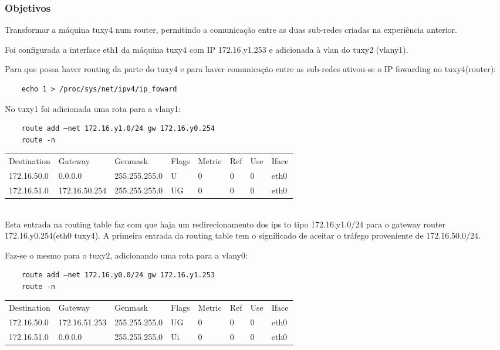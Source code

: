 \documentclass[a4paper]{article}
\begin{document}
\subsubsection{Objetivos}
Transformar a máquina tuxy4 num router, permitindo a comunicação entre as duas sub-redes criadas na experiência anterior.

Foi configurada a interface eth1 da máquina tuxy4 com IP 172.16.y1.253 e adicionada à vlan do tuxy2 (vlany1).

Para que possa haver routing da parte do tuxy4 e para haver comunicação entre as sub-redes ativou-se o IP fowarding no tuxy4(router):
\begin{verbatim}
	echo 1 > /proc/sys/net/ipv4/ip_foward
\end{verbatim}

No tuxy1 foi adicionada uma rota para a vlany1:
\begin{verbatim}
	route add –net 172.16.y1.0/24 gw 172.16.y0.254
	route -n
\end{verbatim}

\begin{tabular}{l l l l l l l l}
Destination & Gateway & Genmask & Flags & Metric & Ref & Use & Iface \\
172.16.50.0 & 0.0.0.0 & 255.255.255.0 & U & 0 & 0 & 0 & eth0 \\
172.16.51.0 & 172.16.50.254 & 255.255.255.0 & UG & 0 & 0 & 0 & eth0
\end{tabular} \\

Esta entrada na routing table faz com que haja um redirecionamento dos ips to tipo 172.16.y1.0/24 para o gateway router
172.16.y0.254(eth0 tuxy4). A primeira entrada da routing table tem o significado de aceitar o tráfego proveniente de 172.16.50.0/24.

Faz-se o mesmo para o tuxy2, adicionando uma rota para a vlany0:
\begin{verbatim}
	route add –net 172.16.y0.0/24 gw 172.16.y1.253
	route -n
\end{verbatim}

\begin{tabular}{l l l l l l l l}
Destination & Gateway & Genmask & Flags & Metric & Ref & Use & Iface \\
172.16.50.0 & 172.16.51.253 & 255.255.255.0 & UG & 0 & 0 & 0 & eth0 \\
172.16.51.0 & 0.0.0.0 & 255.255.255.0 & Ui & 0 & 0 & 0 & eth0
\end{tabular} \\
\end{document}
